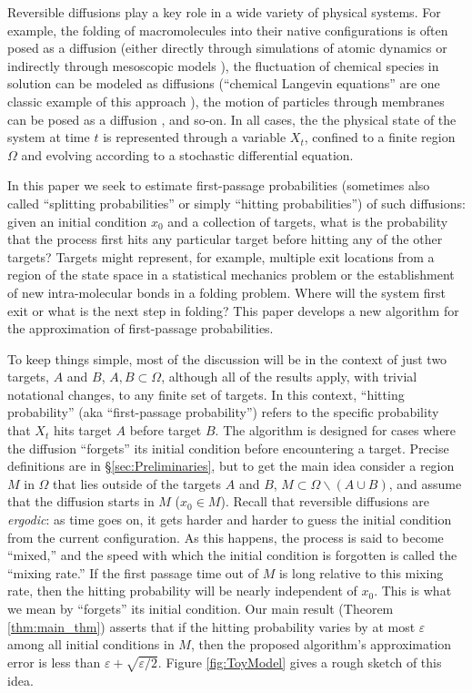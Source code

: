 \documentclass[12pt, nofootinbib,english, amsmath, amssymb, aps, priprint, graphicx,floatfix]{revtex4-1}
\theoremstyle{plain}
\theoremstyle{definition}
\theoremstyle{plain}
\begin{document}
Reversible diffusions play a key role in a wide variety of physical systems.  For example, the folding of macromolecules into their native configurations is often posed as a diffusion (either directly through simulations of atomic dynamics or indirectly through mesoscopic models \cite{Scheraga2007-qw,Hospital2015-ol,lei2010direct}), the fluctuation of chemical species in solution can be modeled as diffusions (``chemical Langevin equations'' are one classic example of this approach \cite{sotiropoulos2011analytical,gillespie2000chemical}), the motion of particles through membranes can be posed as a diffusion \cite{holcman2004escape}, and so-on.   In all cases, the the physical state of the system at time $t$ is represented through a variable $X_t$, confined to a finite region $\Omega$ and evolving according to a stochastic differential equation.  

In this paper we seek to estimate first-passage probabilities 
(sometimes also called ``splitting probabilities'' \cite{E2006-fm} or simply ``hitting probabilities'')
of such diffusions: given an initial condition $x_0$ and a collection of targets, what is the probability that the process first hits any particular target before hitting any of the other targets? Targets might represent, for example, multiple  exit locations from a region of the state space in a statistical mechanics problem or the establishment of new intra-molecular bonds in a folding problem. Where will the system first exit or  what is the next step in folding?  This paper develops a new algorithm for the  approximation of first-passage probabilities.

To keep things simple, most of the discussion will be in the context of just two targets, $A$ and $B$, $A,B\subset\Omega$, although all of the results apply, with trivial notational changes, to any finite set of targets. In this context, ``hitting probability'' 
(aka  ``first-passage probability'') refers to the specific probability that $X_t$ hits target $A$ before target $B$.  
The algorithm is designed for cases where the diffusion ``forgets'' its initial condition before encountering a target.  Precise definitions are in \S\ref{sec:Preliminaries}, but to get the main idea consider a region $M$ in $\Omega$ that lies outside of the targets $A$ and $B$, $M\subset \Omega\backslash(A\cup B)$,
and assume that the diffusion starts in $M$ ($x_0\in M$).
Recall that reversible diffusions are {\em ergodic}: as time goes on, it gets harder and harder to guess the initial condition from the current configuration.  As this happens, the process is said to become ``mixed,'' and the speed with which the initial condition is forgotten is called the ``mixing rate.''  If the first passage time out of $M$ is long relative to this mixing rate, then the hitting probability will be nearly independent of $x_0$. This is what we mean by ``forgets'' its initial condition. Our main result (Theorem \ref{thm:main_thm}) asserts that if the
hitting probability varies by at most $\varepsilon$ among all initial conditions in $M$, then the proposed algorithm's approximation error is less than $\varepsilon + \sqrt{\varepsilon/2}$.  Figure \ref{fig:ToyModel} gives a rough sketch of this idea.  
\end{document}

